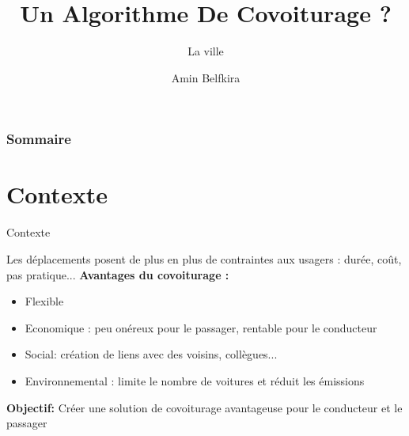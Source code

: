 \documentclass{beamer}
\title[TIPE]{Un Algorithme De Covoiturage ?}
\subtitle{La ville}
\author[A. Belfkira]{Amin Belfkira}
\institute{Candidat 12135}
\date{}
\begin{document}
\frame{\titlepage}


\begin{frame}
  \frametitle
  {Sommaire}
  \tableofcontents
\end{frame}


\section{Contexte}
\begin{frame}{Contexte}

  Les déplacements posent de plus en plus de contraintes aux usagers : durée, coût, pas pratique...
  \newline
  \textbf{Avantages du covoiturage :}
  \begin{itemize}
    \item Flexible
    \item Economique : peu onéreux pour le passager, rentable pour le conducteur
    \item Social: création de liens avec des voisins, collègues...
    \item Environnemental : limite le nombre de voitures et réduit les émissions
  \end{itemize}

  \textbf{Objectif:} Créer une solution de covoiturage avantageuse pour le conducteur et le passager


\end{frame}

\end{document}
